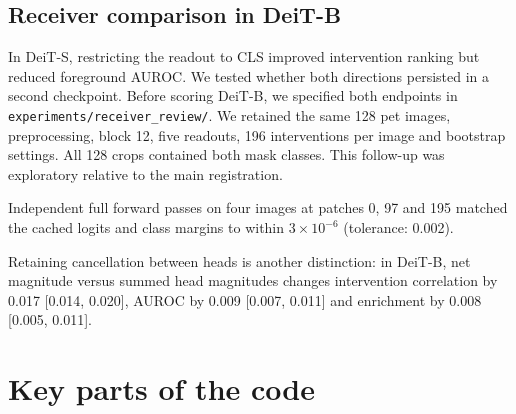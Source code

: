 \subsection{Receiver comparison in DeiT-B}
\label{app:replication}
In DeiT-S, restricting the readout to CLS improved intervention ranking but reduced foreground AUROC. We tested whether both directions persisted in a second checkpoint. Before scoring DeiT-B, we specified both endpoints in \texttt{experiments/receiver\_review/}. We retained the same 128 pet images, preprocessing, block 12, five readouts, 196 interventions per image and bootstrap settings. All 128 crops contained both mask classes. This follow-up was exploratory relative to the main registration.

Independent full forward passes on four images at patches 0, 97 and 195 matched the cached logits and class margins to within $3\times10^{-6}$ (tolerance: 0.002).

\begin{center}\begin{minipage}{\linewidth}
\centering\small\setlength{\tabcolsep}{4pt}
\end{minipage}\end{center}

\begin{center}\begin{minipage}{\linewidth}
\centering\small
\end{minipage}\end{center}

Retaining cancellation between heads is another distinction: in DeiT-B, net magnitude versus summed head magnitudes changes intervention correlation by 0.017 [0.014, 0.020], AUROC by 0.009 [0.007, 0.011] and enrichment by 0.008 [0.005, 0.011].

\clearpage
\section{Key parts of the code}
\label{app:code}

